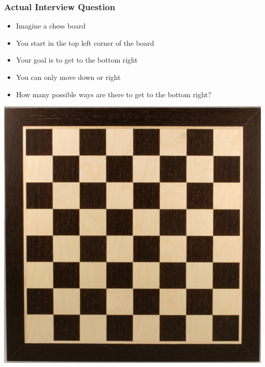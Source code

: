 \documentclass{beamer}
\begin{document}
\begin{frame}
\frametitle{Actual Interview Question}
\begin{itemize}
	\item Imagine a chess board
	\item You start in the top left corner of the board
	\item Your goal is to get to the bottom right
	\item You can only move down or right
	\item How many possible ways are there to get to the bottom right?
\end{itemize}

\centering
\includegraphics[scale=0.2]{./images/chess.jpg}

\end{frame}

\end{document}
